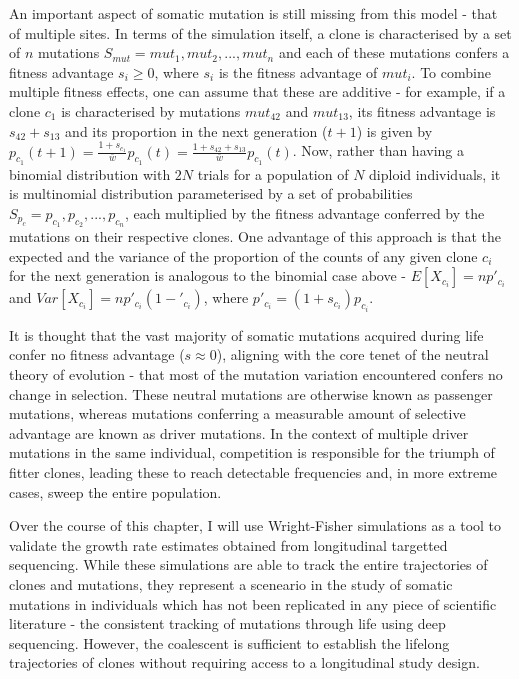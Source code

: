 An important aspect of somatic mutation is still missing from this model - that of multiple sites. In terms of the simulation itself, a clone is characterised by a set of $n$ mutations $S_{mut} = {mut_1,mut_2,...,mut_n}$ and each of these mutations confers a fitness advantage $s_i \geq 0$, where $s_i$ is the fitness advantage of $mut_i$. To combine multiple fitness effects, one can assume that these are additive - for example, if a clone $c_1$ is characterised by mutations $mut_42$ and $mut_13$, its fitness advantage is $s_42 + s_13$ and its proportion in the next generation ($t+1$) is given by $p_{c_1}(t+1) = \frac{1+s_{c_1}}{\bar{w}}p_{c_1}(t) = \frac{1+s_{42}+s_{13}}{\bar{w}}p_{c_1}(t)$. Now, rather than having a binomial distribution with $2N$ trials for a population of $N$ diploid individuals, it is multinomial distribution parameterised by a set of probabilities $S_{p_c} = {p_{c_1},p_{c_2},...,p_{c_n}}$, each multiplied by the fitness advantage conferred by the mutations on their respective clones. One advantage of this approach is that the expected and the variance of the proportion of the counts of any given clone $c_i$ for the next generation is analogous to the binomial case above - $E[X_{c_i}] = np'_{c_i}$ and $Var[X_{c_i}] = np'_{c_i}(1-'_{c_i})$, where $p'_{c_i} = (1+s_{c_i})p_{c_i}$. 

It is thought that the vast majority of somatic mutations acquired during life confer no fitness advantage ($s \approx 0$), aligning with the core tenet of the neutral theory of evolution - that most of the mutation variation encountered confers no change in selection. These neutral mutations are otherwise known as passenger mutations, whereas mutations conferring a measurable amount of selective advantage are known as driver mutations. In the context of multiple driver mutations in the same individual, competition is responsible for the triumph of fitter clones, leading these to reach detectable frequencies and, in more extreme cases, sweep the entire population.

Over the course of this chapter, I will use Wright-Fisher simulations as a tool to validate the growth rate estimates obtained from longitudinal targetted sequencing. While these simulations are able to track the entire trajectories of clones and mutations, they represent a sceneario in the study of somatic mutations in individuals which has not been replicated in any piece of scientific literature - the consistent tracking of mutations through life using deep sequencing. However, the coalescent is sufficient to establish the lifelong trajectories of clones without requiring access to a longitudinal study design.

